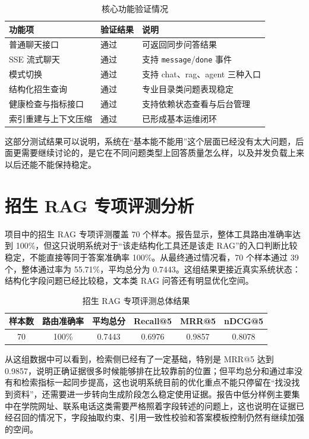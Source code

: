 \documentclass[UTF8,zihao=-4,oneside]{ctexbook}
\numberwithin{equation}{chapter}
\begin{document}
\begin{table}[H]
  \centering
  \caption{核心功能验证情况}
  \begin{tabularx}{0.95\textwidth}{lYY}
    \toprule
    功能项 & 验证结果 & 说明 \\
    \midrule
    普通聊天接口 & 通过 & 可返回同步问答结果 \\
    SSE 流式聊天 & 通过 & 支持 \texttt{message}/\texttt{done} 事件 \\
    模式切换 & 通过 & 支持 chat、rag、agent 三种入口 \\
    结构化招生查询 & 通过 & 专业目录类问题表现稳定 \\
    健康检查与指标接口 & 通过 & 支持依赖状态查看与后台管理 \\
    索引重建与上下文压缩 & 通过 & 已形成基本运维闭环 \\
    \bottomrule
  \end{tabularx}
\end{table}

这部分测试结果可以说明，系统在“基本能不能用”这个层面已经没有太大问题，后面更需要继续讨论的，是它在不同问题类型上回答质量怎么样，以及并发负载上来以后还能不能保持稳定。

\section{招生 RAG 专项评测分析}
项目中的招生 RAG 专项评测覆盖 70 个样本。报告显示，整体工具路由准确率达到 100\%，但这只说明系统对于“该走结构化工具还是该走 RAG”的入口判断比较稳定，不能直接等同于答案准确率 100\%。从最终通过情况看，70 个样本通过 39 个，整体通过率为 55.71\%，平均总分为 0.7443。这组结果更接近真实系统状态：结构化字段问题已经比较稳，文本类 RAG 问答还有明显优化空间\cite{ragevalreport}。

\begin{table}[H]
  \centering
  \caption{招生 RAG 专项评测总体结果}
  \begin{tabular}{cccccc}
    \toprule
    样本数 & 路由准确率 & 平均总分 & Recall@5 & MRR@5 & nDCG@5 \\
    \midrule
    70 & 100\% & 0.7443 & 0.6976 & 0.9857 & 0.8078 \\
    \bottomrule
  \end{tabular}
\end{table}

从这组数据中可以看到，检索侧已经有了一定基础，特别是 MRR@5 达到 0.9857，说明正确证据很多时候能够排在比较靠前的位置；但平均总分和通过率没有和检索指标一起同步提高，这也说明系统目前的优化重点不能只停留在“找没找到资料”，还需要进一步转向生成阶段怎么稳定使用证据。报告中低分样例主要集中在学院网址、联系电话这类需要严格照着字段转述的问题上，这也说明在证据已经召回的情况下，字段抽取约束、引用一致性校验和答案模板控制仍然有继续加强的空间。
\end{document}
